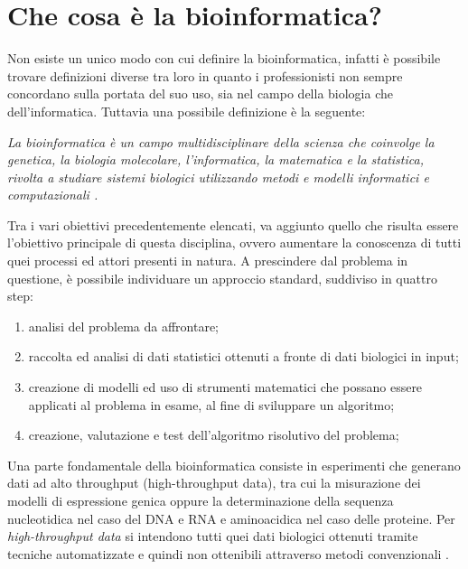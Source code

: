\section{Che cosa \`e la bioinformatica?}
Non esiste un unico modo con cui definire la bioinformatica, infatti è possibile trovare definizioni diverse tra loro in quanto i professionisti non sempre concordano sulla portata del suo uso, sia nel campo della biologia che dell'informatica. Tuttavia una possibile definizione è la seguente:
\begin{center}
\textit{La bioinformatica è un campo multidisciplinare della scienza che coinvolge la genetica, la biologia molecolare, l'informatica, la matematica e la statistica, rivolta a studiare sistemi biologici utilizzando metodi e modelli informatici e computazionali \cite{bioinfomaticsdefcan} \cite{icarcnribioinfdefinition} \cite{treccanibioinf}.}
\end{center}
Tra i vari obiettivi precedentemente elencati, va aggiunto quello che risulta essere l'obiettivo principale di questa disciplina, ovvero aumentare la conoscenza di tutti quei processi ed attori presenti in natura.
\newline
A prescindere dal problema in questione, è possibile individuare un approccio standard, suddiviso in quattro step:
\begin{enumerate}
	\item analisi del problema da affrontare;
	\item raccolta ed analisi di dati statistici ottenuti a fronte di dati biologici in input;
	\item creazione di modelli ed uso di strumenti matematici che possano essere applicati al problema in esame, al fine di sviluppare un algoritmo;
	\item creazione, valutazione e test dell'algoritmo risolutivo del problema;
\end{enumerate}
Una parte fondamentale della bioinformatica consiste in esperimenti che generano dati ad alto throughput (high-throughput data), tra cui la misurazione dei modelli di espressione genica oppure la determinazione della sequenza nucleotidica nel caso del DNA e RNA e aminoacidica nel caso delle proteine. Per \textit{high-throughput data} si intendono tutti quei dati biologici ottenuti tramite tecniche automatizzate e quindi non ottenibili attraverso metodi convenzionali \cite{dataMiningInBioinformatics}.
